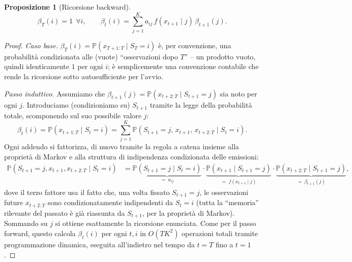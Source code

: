 \documentclass[11pt]{article}
\newtheorem{proposition}[theorem]{Proposizione}
\theoremstyle{definition}
\theoremstyle{remark}
\begin{document}
\begin{proposition}[Ricorsione backward]
\[
\beta_T(i)=1\ \ \forall i, \qquad
\beta_t(i) = \sum_{j=1}^K a_{ij}\,f(x_{t+1}\mid j)\,\beta_{t+1}(j).
\]
\end{proposition}
\begin{proof}
\emph{Caso base.} $\beta_T(i)=\mathbb{P}(x_{T+1:T}\mid S_T=i)$ \`e, per convenzione, una probabilit\`a condizionata alle (vuote) ``osservazioni dopo $T$'' -- un prodotto vuoto, quindi identicamente $1$ per ogni $i$; \`e semplicemente una convenzione contabile che rende la ricorsione sotto autosufficiente per l'avvio.

\emph{Passo induttivo.} Assumiamo che $\beta_{t+1}(j)=\mathbb{P}(x_{t+2:T}\mid S_{t+1}=j)$ sia noto per ogni $j$. Introduciamo (condizioniamo su) $S_{t+1}$ tramite la legge della probabilit\`a totale, scomponendo sul suo possibile valore $j$:
\[
\beta_t(i) = \mathbb{P}(x_{t+1:T}\mid S_t=i) = \sum_{j=1}^K \mathbb{P}(S_{t+1}=j,\,x_{t+1},\,x_{t+2:T}\mid S_t=i).
\]
Ogni addendo si fattorizza, di nuovo tramite la regola a catena insieme alla propriet\`a di Markov e alla struttura di indipendenza condizionata delle emissioni:
\begin{align*}
\mathbb{P}(S_{t+1}=j,x_{t+1},x_{t+2:T}\mid S_t=i)
&= \underbrace{\mathbb{P}(S_{t+1}=j\mid S_t=i)}_{=\ a_{ij}}\cdot\underbrace{\mathbb{P}(x_{t+1}\mid S_{t+1}=j)}_{=\ f(x_{t+1}\mid j)}\cdot\underbrace{\mathbb{P}(x_{t+2:T}\mid S_{t+1}=j)}_{=\ \beta_{t+1}(j)},
\end{align*}
dove il terzo fattore usa il fatto che, una volta fissato $S_{t+1}=j$, le osservazioni future $x_{t+2:T}$ sono condizionatamente indipendenti da $S_t=i$ (tutta la ``memoria'' rilevante del passato \`e gi\`a riassunta da $S_{t+1}$, per la propriet\`a di Markov). Sommando su $j$ si ottiene esattamente la ricorsione enunciata. Come per il passo forward, questo calcola $\beta_t(i)$ per ogni $t,i$ in $O(TK^2)$ operazioni totali tramite programmazione dinamica, eseguita all'indietro nel tempo da $t=T$ fino a $t=1$.
\end{proof}
\end{document}
